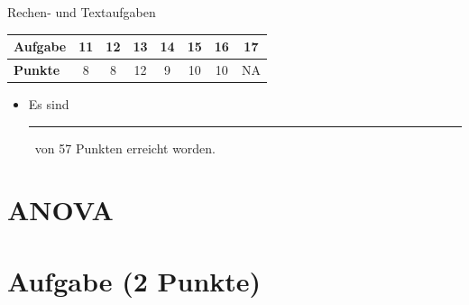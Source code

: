 \documentclass[a4paper, 9pt]{scrartcl}\usepackage[]{graphicx}\usepackage[]{xcolor}
\begin{document}
\begin{graybox}{Rechen- und Textaufgaben}
  \begin{center}
    \large
    \begin{tabular}{|l|c|c|c|c|c|c|c|}
      \hline
      \textbf{Aufgabe} & \textbf{11} & \textbf{12} & \textbf{13} & \textbf{14} & \textbf{15} & \textbf{16} & \textbf{17} \strut\\
      \hline
      \textbf{Punkte} & 
      \hspace{1Ex}\Large\textcolor{gray!70}{8}\hspace{1Ex}  & 
      \hspace{1Ex}\Large\textcolor{gray!70}{8}\hspace{1Ex}  & 
      \hspace{1Ex}\Large\textcolor{gray!70}{12}\hspace{1Ex}  & 
      \hspace{1Ex}\Large\textcolor{gray!70}{9}\hspace{1Ex}  & 
      \hspace{1Ex}\Large\textcolor{gray!70}{10}\hspace{1Ex}  & 
      \hspace{1Ex}\Large\textcolor{gray!70}{10}\hspace{1Ex}  & 
      \hspace{1Ex}\Large\textcolor{gray!70}{NA}\hspace{1Ex} \strut\\
      \hline
  \end{tabular}
\end{center}
\begin{itemize}
\item Es sind \rule[0ex]{2em}{.4pt}\, von 57 Punkten erreicht worden.
\end{itemize}
\end{graybox}

\clearpage

\section*{ANOVA}

\section{Aufgabe \hfill (2 Punkte)}
\end{document}
